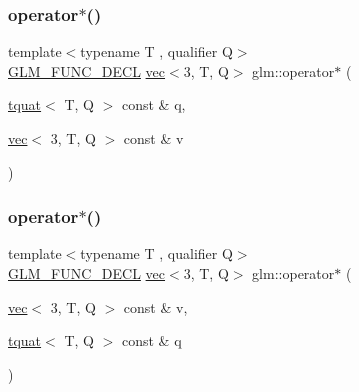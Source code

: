 \subsubsection{\texorpdfstring{operator$\ast$()}{operator*()}\hspace{0.1cm}{\footnotesize\ttfamily [2/7]}}
{\footnotesize\ttfamily template$<$typename T , qualifier Q$>$ \\
\mbox{\hyperlink{setup_8hpp_ab2d052de21a70539923e9bcbf6e83a51}{G\+L\+M\+\_\+\+F\+U\+N\+C\+\_\+\+D\+E\+CL}} \mbox{\hyperlink{structglm_1_1vec}{vec}}$<$3, T, Q$>$ glm\+::operator$\ast$ (\begin{DoxyParamCaption}\item[{\mbox{\hyperlink{structglm_1_1tquat}{tquat}}$<$ T, Q $>$ const \&}]{q,  }\item[{\mbox{\hyperlink{structglm_1_1vec}{vec}}$<$ 3, T, Q $>$ const \&}]{v }\end{DoxyParamCaption})}

\mbox{\label{group__gtc__quaternion_ga97f1c7e2d4ae80aad5d8813aed7d860e}} 
\subsubsection{\texorpdfstring{operator$\ast$()}{operator*()}\hspace{0.1cm}{\footnotesize\ttfamily [3/7]}}
{\footnotesize\ttfamily template$<$typename T , qualifier Q$>$ \\
\mbox{\hyperlink{setup_8hpp_ab2d052de21a70539923e9bcbf6e83a51}{G\+L\+M\+\_\+\+F\+U\+N\+C\+\_\+\+D\+E\+CL}} \mbox{\hyperlink{structglm_1_1vec}{vec}}$<$3, T, Q$>$ glm\+::operator$\ast$ (\begin{DoxyParamCaption}\item[{\mbox{\hyperlink{structglm_1_1vec}{vec}}$<$ 3, T, Q $>$ const \&}]{v,  }\item[{\mbox{\hyperlink{structglm_1_1tquat}{tquat}}$<$ T, Q $>$ const \&}]{q }\end{DoxyParamCaption})}

\mbox{\label{group__gtc__quaternion_ga69d38a6ce6b49b97147c26274ada8911}} 
